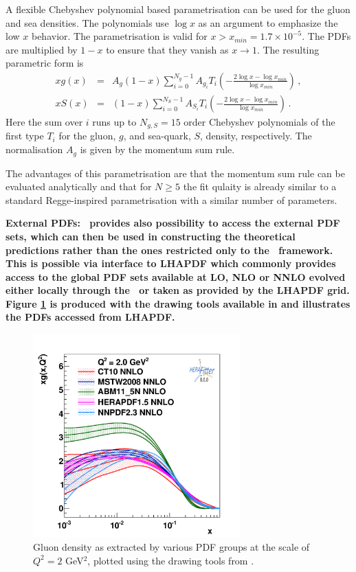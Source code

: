 \begin{description}
A flexible Chebyshev polynomial based parametrisation can be used for the gluon and sea densities. The polynomials
use $\log x$ as an argument to emphasize the low $x$ behavior. 
The parametrisation is valid for $x>x_{min} = 1.7\times 10^{-5}$. The PDFs are multiplied
by $1-x$ to ensure that they vanish as $x\to 1$. The resulting parametric form is 
\begin{eqnarray}
x g(x) &=& A_g \left(1-x\right) \sum_{i=0}^{N_g-1} A_{g_i} T_i \left(-\frac{\textstyle 2\log x - \log x_{min} } {\textstyle \log x_{min} } \right)\,, \label{eq:glu} \\
x S(x) &=& \left(1-x\right) \sum_{i=0}^{N_S-1} A_{S_i} T_i \left(-\frac{\textstyle 2\log x - \log x_{min} } {\textstyle \log x_{min} } \right)\,. \label{eq:sea} 
\end{eqnarray}
Here the sum over $i$ runs up to $N_{g,S}=15$ order Chebyshev polynomials of the first type $T_i$ for
the gluon, $g$, and sea-quark, $S$, density, respectively. 
The normalisation $A_g$ is given by the momentum sum rule.

The advantages of this parametrisation are that the momentum sum rule can be evaluated analytically 
and that for $N \ge 5$ the fit qulaity is already similar
to a standard Regge-inspired parametrisation with a similar number of parameters.

\item \bf{External PDFs:} \rm 
\fitter\ provides also possibility to access the  external PDF sets, which can then be used in constructing the theoretical predictions rather than the ones restricted only to the \fitter\ framework. This is possible via interface to LHAPDF which commonly provides access to the global PDF sets available at LO, NLO or NNLO evolved either locally through the \fitter\ or taken as provided by the LHAPDF grid. Figure \ref{fig:pdfs} is produced with the drawing tools available in \fitter and illustrates the PDFs accessed from LHAPDF. 
\end{description}

\begin{figure}[!ht]
   \centering
   \includegraphics[width=8cm]{pdfs.pdf}
   \caption{Gluon density as extracted by various PDF groups at the scale of $Q^2=2$ GeV$^2$, plotted using the drawing tools from \fitter.} 
 \label{fig:pdfs}
\end{figure}

